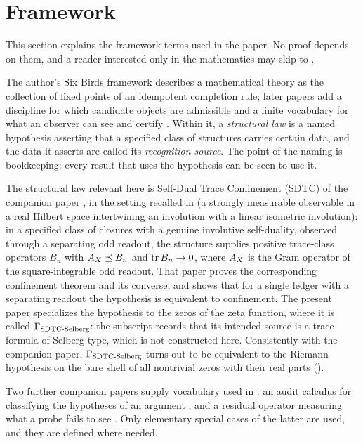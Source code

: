 \section{Framework}
\label{sec:framework}

This section explains the framework terms used in the paper.  No
proof depends on them, and a reader interested only in the
mathematics may skip to .

The author's Six Birds framework \citep{TsiokosFoundationsI2026}
describes a mathematical theory as the collection of fixed points of
an idempotent completion rule; later papers add a discipline for which
candidate objects are admissible \citep{TsiokosFoundationsII2026} and
a finite vocabulary for what an observer can see and certify
\citep{TsiokosFoundationsIII2026}.  Within it, a \emph{structural law}
is a named hypothesis asserting that a specified class of structures
carries certain data, and the data it asserts are called its
\emph{recognition source}.  The point of the naming is bookkeeping:
every result that uses the hypothesis can be seen to use it.

The structural law relevant here is Self-Dual Trace Confinement
(SDTC) of the companion paper \citep{TsiokosSDTC2026}, in the setting
recalled in  (a strongly measurable observable in a
real Hilbert space intertwining an involution with a linear isometric
involution): in a specified class of closures with a genuine involutive self-duality, observed
through a separating odd readout, the structure supplies positive trace-class operators \(B_n\) with
\(A_{X}\preceq B_n\) and \(\operatorname{tr} B_n\to0\), where \(A_{X}\) is the Gram
operator of the square-integrable odd readout.
That paper proves the corresponding confinement theorem and its
converse, and shows that for a single ledger with a separating readout
the hypothesis is equivalent to confinement.  The present paper
specializes the hypothesis to the zeros of the zeta function, where it
is called \(\Gamma_{\mathrm{SDTC\text{-}Selberg}}\): the subscript records that its intended
source is a trace formula of Selberg type, which is not constructed
here.  Consistently with the companion paper, \(\Gamma_{\mathrm{SDTC\text{-}Selberg}}\) turns out to be equivalent to the Riemann hypothesis
on the bare shell of all nontrivial zeros with their real parts
().

Two further companion papers supply vocabulary used in
: an audit calculus for
classifying the hypotheses of an argument \citep{TsiokosAOR2026}, and
a residual operator measuring what a probe fails to see
\citep{TsiokosXiCompanion2026}.  Only elementary special cases of the
latter are used, and they are defined where needed.
